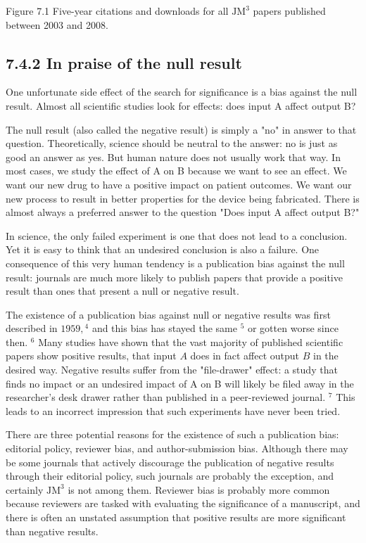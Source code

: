 Figure 7.1 Five-year citations and downloads for all $\mathrm{JM}^{3}$ papers published between 2003 and 2008.

\subsection*{7.4.2 In praise of the null result}
One unfortunate side effect of the search for significance is a bias against the null result. Almost all scientific studies look for effects: does input A affect output B?

The null result (also called the negative result) is simply a "no" in answer to that question. Theoretically, science should be neutral to the answer: no is just as good an answer as yes. But human nature does not usually work that way. In most cases, we study the effect of A on B because we want to see an effect. We want our new drug to have a positive impact on patient outcomes. We want our new process to result in better properties for the device being fabricated. There is almost always a preferred answer to the question "Does input A affect output B?"

In science, the only failed experiment is one that does not lead to a conclusion. Yet it is easy to think that an undesired conclusion is also a failure. One consequence of this very human tendency is a publication bias against the null result: journals are much more likely to publish papers that provide a positive result than ones that present a null or negative result.

The existence of a publication bias against null or negative results was first described in $1959,{ }^{4}$ and this bias has stayed the same ${ }^{5}$ or gotten worse since then. ${ }^{6}$ Many studies have shown that the vast majority of published scientific papers show positive results, that input $A$ does in fact affect output $B$ in the desired way. Negative results suffer from the "file-drawer" effect: a study that finds no impact or an undesired impact of A on B will likely be filed away in the researcher's desk drawer rather than published in a peer-reviewed journal. ${ }^{7}$ This leads to an incorrect impression that such experiments have never been tried.

There are three potential reasons for the existence of such a publication bias: editorial policy, reviewer bias, and author-submission bias. Although there may be some journals that actively discourage the publication of negative results through their editorial policy, such journals are probably the exception, and certainly $\mathrm{JM}^{3}$ is not among them. Reviewer bias is probably more common because reviewers are tasked with evaluating the significance of a manuscript, and there is often an unstated assumption that positive results are more significant than negative results.

